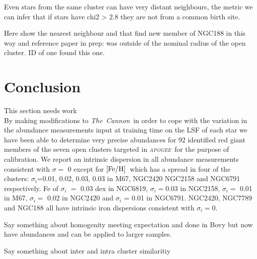 \documentclass[14pt, preprint2]{aastex6}
\newcommand{\project}[1]{\textsl{#1}}
\newcommand{\tc}{\project{The~Cannon}}
\newcommand{\apogee}{\project{\textsc{apogee}}}
\newcommand{\feh}{\mbox{$\rm [Fe/H]$}}
\begin{document}
Even stars from the same cluster can have very distant neighbours, the metric we can infer that if stars have chi2 > 2.8 they are not from a common birth site. 

Here show the nearest neighbour and that find new member of NGC188 in this way and reference paper in prep: was outside of the nominal radius of the open cluster. ID of one found this one. 



\section{Conclusion}
This section needs work \\

By making modifications to \tc\ in order to cope with the variation in the abundance measurements input at training time on the LSF of each star we have been able to determine very precise abundances for 92 identified red giant members of the seven open clusters targeted in \apogee\ for the purpose of calibration. We report an intrinsic dispersion in all abundance measurements consistent with $\sigma=$ 0 except for \feh\ which has a spread in four of the clusters: $\sigma_i$=0.01, 0.02,  0.03, 0.03 in M67, NGC2420 NGC2158 and NGC6791 respectively. 
Fe of $\sigma_i$ $=$ 0.03 dex in NGC6819, $\sigma_i$$=$0.03 in NGC2158, $\sigma_i$$=$ 0.01 in M67,  $\sigma_i$$=$ 0.02 in NGC2420 and $\sigma_i$ = 0.01 in NGC6791. NGC2420, NGC7789 and NGC188 all have intrinsic iron dispersions consistent with  $\sigma_i$$=$0. 

Say something about homogenity meeting expectation and done in Bovy but now have abundances and can be applied to larger samples. 

Say something about inter and intra cluster similaritiy


\pagebreak
\end{document}
